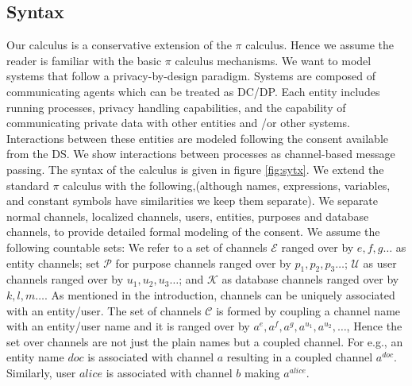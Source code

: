 \subsection{Syntax}
Our calculus is a conservative extension of the $ \pi$ calculus.  Hence we assume the reader is familiar %
with the basic $ \pi$ calculus mechanisms. We want to model %
systems that follow
a privacy-by-design paradigm. Systems are composed of communicating agents which can be treated as DC/DP. Each entity includes running processes, privacy handling capabilities, and the capability of communicating private data with other entities and /or other systems. Interactions between these entities are modeled following the consent available from the DS. We show interactions between processes as channel-based message passing. The syntax of the calculus is given in figure \ref{fig:sytx}.  We extend the standard $ \pi$ calculus with the following,(although names, expressions, variables, and constant symbols have similarities we keep them separate). We separate normal channels, localized channels, users, entities, purposes and database channels, to provide detailed formal modeling of the consent.
We assume the following countable sets:  
We refer to a set of channels $\mathcal{E}$ ranged over by $ e, f, g \dots $ as entity channels; set $\mathcal{P}$ for purpose channels ranged over by $ p_1, p_2, p_3 \dots$; $\mathcal{U}$ as user channels ranged over by $ u_1, u_2, u_3 \dots  $;  and $\mathcal{K}$ as database channels ranged over by $ k,l,m \dots $.
As mentioned in the introduction, channels can be uniquely associated with an entity/user. The set of channels $\mathcal{C}$  is formed by coupling a channel name with an entity/user name and it is ranged over by $ a^{e}, a^{f}, a^{g} , a^{u_1}, a^{u_2},\dots $, %
Hence the set over channels are not just the plain names but a coupled channel. For e.g., an entity name $ doc$  is associated with channel $a$ resulting in a coupled channel $ a^{doc}$.  Similarly, user $ alice$ is associated with channel $ b$ making $ a^{alice}$. 
